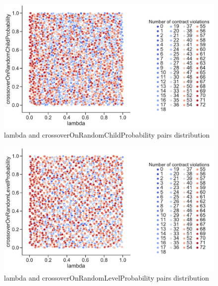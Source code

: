 \begin{figure}
	\centering
	\includegraphics[width=\textwidth]{images/PairsDistr/lambda_crossoverOnRandomChildProbability.pdf}
	\caption[lambda and crossoverOnRandomChildProbability pairs distribution]{lambda and crossoverOnRandomChildProbability pairs distribution}
	\label{fig:lambda_crossoverOnRandomChildProbability_pair}
\end{figure}
\clearpage
\begin{figure}
	\centering
	\includegraphics[width=\textwidth]{images/PairsDistr/lambda_crossoverOnRandomLevelProbability.pdf}
	\caption[lambda and crossoverOnRandomLevelProbability pairs distribution]{lambda and crossoverOnRandomLevelProbability pairs distribution}
	\label{fig:lambda_crossoverOnRandomLevelProbability_pair}
\end{figure}
\clearpage
